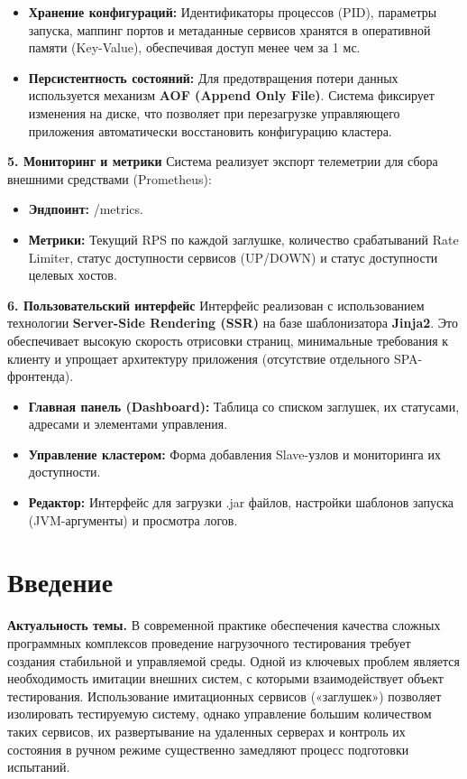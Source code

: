 \documentclass[
]{article}
\begin{document}
\begin{itemize}
\item
  \textbf{Хранение конфигураций:} Идентификаторы процессов (PID),
  параметры запуска, маппинг портов и метаданные сервисов хранятся в
  оперативной памяти (Key-Value), обеспечивая доступ менее чем за 1 мс.
\item
  \textbf{Персистентность состояний:} Для предотвращения потери данных
  используется механизм \textbf{AOF (Append Only File)}. Система
  фиксирует изменения на диске, что позволяет при перезагрузке
  управляющего приложения автоматически восстановить конфигурацию
  кластера.
\end{itemize}

\textbf{5. Мониторинг и метрики} Система реализует экспорт телеметрии
для сбора внешними средствами (Prometheus):

\begin{itemize}
\item
  \textbf{Эндпоинт:} /metrics.
\item
  \textbf{Метрики:} Текущий RPS по каждой заглушке, количество
  срабатываний Rate Limiter, статус доступности сервисов (UP/DOWN) и
  статус доступности целевых хостов.
\end{itemize}

\textbf{6. Пользовательский интерфейс} Интерфейс реализован с
использованием технологии \textbf{Server-Side Rendering (SSR)} на базе
шаблонизатора \textbf{Jinja2}. Это обеспечивает высокую скорость
отрисовки страниц, минимальные требования к клиенту и упрощает
архитектуру приложения (отсутствие отдельного SPA-фронтенда).

\begin{itemize}
\item
  \textbf{Главная панель (Dashboard):} Таблица со списком заглушек, их
  статусами, адресами и элементами управления.
\item
  \textbf{Управление кластером:} Форма добавления Slave-узлов и
  мониторинга их доступности.
\item
  \textbf{Редактор:} Интерфейс для загрузки .jar файлов, настройки
  шаблонов запуска (JVM-аргументы) и просмотра логов.
\end{itemize}

\section{Введение}\label{ux432ux432ux435ux434ux435ux43dux438ux435}

\textbf{Актуальность темы.} В современной практике обеспечения качества
сложных программных комплексов проведение нагрузочного тестирования
требует создания стабильной и управляемой среды. Одной из ключевых
проблем является необходимость имитации внешних систем, с которыми
взаимодействует объект тестирования. Использование имитационных сервисов
(«заглушек») позволяет изолировать тестируемую систему, однако
управление большим количеством таких сервисов, их развертывание на
удаленных серверах и контроль их состояния в ручном режиме существенно
замедляют процесс подготовки испытаний.
\end{document}
